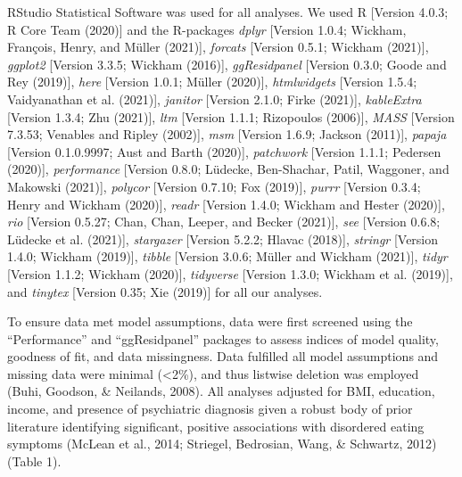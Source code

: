 \documentclass[
  english,
  man, fleqn, noextraspace,floatsintext]{apa6}
\begin{document}
RStudio Statistical Software was used for all analyses. We used R {[}Version 4.0.3; R Core Team (2020){]} and the R-packages \emph{dplyr} {[}Version 1.0.4; Wickham, François, Henry, and Müller (2021){]}, \emph{forcats} {[}Version 0.5.1; Wickham (2021){]}, \emph{ggplot2} {[}Version 3.3.5; Wickham (2016){]}, \emph{ggResidpanel} {[}Version 0.3.0; Goode and Rey (2019){]}, \emph{here} {[}Version 1.0.1; Müller (2020){]}, \emph{htmlwidgets} {[}Version 1.5.4; Vaidyanathan et al. (2021){]}, \emph{janitor} {[}Version 2.1.0; Firke (2021){]}, \emph{kableExtra} {[}Version 1.3.4; Zhu (2021){]}, \emph{ltm} {[}Version 1.1.1; Rizopoulos (2006){]}, \emph{MASS} {[}Version 7.3.53; Venables and Ripley (2002){]}, \emph{msm} {[}Version 1.6.9; Jackson (2011){]}, \emph{papaja} {[}Version 0.1.0.9997; Aust and Barth (2020){]}, \emph{patchwork} {[}Version 1.1.1; Pedersen (2020){]}, \emph{performance} {[}Version 0.8.0; Lüdecke, Ben-Shachar, Patil, Waggoner, and Makowski (2021){]}, \emph{polycor} {[}Version 0.7.10; Fox (2019){]}, \emph{purrr} {[}Version 0.3.4; Henry and Wickham (2020){]}, \emph{readr} {[}Version 1.4.0; Wickham and Hester (2020){]}, \emph{rio} {[}Version 0.5.27; Chan, Chan, Leeper, and Becker (2021){]}, \emph{see} {[}Version 0.6.8; Lüdecke et al. (2021){]}, \emph{stargazer} {[}Version 5.2.2; Hlavac (2018){]}, \emph{stringr} {[}Version 1.4.0; Wickham (2019){]}, \emph{tibble} {[}Version 3.0.6; Müller and Wickham (2021){]}, \emph{tidyr} {[}Version 1.1.2; Wickham (2020){]}, \emph{tidyverse} {[}Version 1.3.0; Wickham et al. (2019){]}, and \emph{tinytex} {[}Version 0.35; Xie (2019){]} for all our analyses.

To ensure data met model assumptions, data were first screened using the ``Performance'' and ``ggResidpanel'' packages to assess indices of model quality, goodness of fit, and data missingness. Data fulfilled all model assumptions and missing data were minimal (\textless2\%), and thus listwise deletion was employed (Buhi, Goodson, \& Neilands, 2008). All analyses adjusted for BMI, education, income, and presence of psychiatric diagnosis given a robust body of prior literature identifying significant, positive associations with disordered eating symptoms (McLean et al., 2014; Striegel, Bedrosian, Wang, \& Schwartz, 2012)(Table 1).
\end{document}

